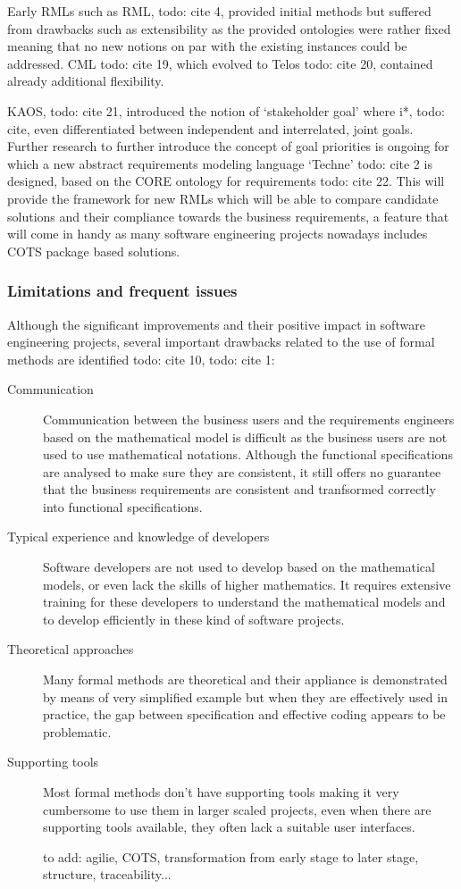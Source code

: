 Early RMLs such as RML, todo: cite 4, provided initial methods but suffered from drawbacks such as extensibility as the provided ontologies were rather fixed meaning that no new notions on par with the existing instances could be addressed. CML todo: cite 19, which evolved to Telos todo: cite 20, contained already additional flexibility. 

KAOS, todo: cite 21, introduced the notion of `stakeholder goal' where i*, todo: cite, even differentiated between independent and interrelated, joint goals.
Further research to further introduce the concept of goal priorities is ongoing for which a new abstract requirements modeling language `Techne' todo: cite 2 is designed, based on the CORE ontology for requirements todo: cite 22. This will provide the framework for new RMLs which will be able to compare candidate solutions and their compliance towards the business requirements, a feature that will come in handy as many software engineering projects nowadays includes COTS package based solutions.

\subsubsection{Limitations and frequent issues}
Although the significant improvements and their positive impact in software engineering projects, several important drawbacks related to the use of formal methods are identified todo: cite 10, todo: cite 1:
\begin{description}
	\item[Communication] Communication between the business users and the requirements engineers based on the mathematical model is difficult as the business users are not used to use mathematical notations. Although the functional specifications are analysed to make sure they are consistent, it still offers no guarantee that the business requirements are consistent and tranfsormed correctly into functional specifications.
	\item[Typical experience and knowledge of developers] Software developers are not used to develop based on the mathematical models, or even lack the skills of higher mathematics. It requires extensive training for these developers to understand the mathematical models and to develop efficiently in these kind of software projects.
	\item[Theoretical approaches] Many formal methods are theoretical and their appliance is demonstrated by means of very simplified example but when they are effectively used in practice, the gap between specification and effective coding appears to be problematic.
	\item[Supporting tools] Most formal methods don't have supporting tools making it very cumbersome to use them in larger scaled projects, even when there are supporting tools available, they often lack a suitable user interfaces.

to add: agilie, COTS, transformation from early stage to later stage, structure, traceability...
	
\end{description}



